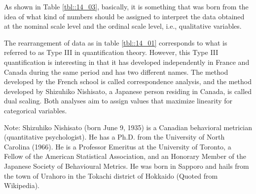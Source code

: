 \documentclass{ltjsbook}
\begin{document}
As shown in Table \ref{tbl::14_03}, basically, it is something that was born from the idea of what kind of numbers should be assigned to interpret the data obtained at the nominal scale level and the ordinal scale level, i.e., qualitative variables.

The rearrangement of data as in table \ref{tbl::14_01} corresponds to what is referred to as Type III in quantification theory. However, this Type III quantification is interesting in that it has developed independently in France and Canada during the same period and has two different names. The method developed by the French school is called correspondence analysis, and the method developed by Shizuhiko Nishisato, a Japanese person residing in Canada, is called dual scaling. Both analyses aim to assign values that maximize linearity for categorical variables.

Note: Shizuhiko Nishisato (born June 9, 1935) is a Canadian behavioral metrician (quantitative psychologist). He has a Ph.D. from the University of North Carolina (1966). He is a Professor Emeritus at the University of Toronto, a Fellow of the American Statistical Association, and an Honorary Member of the Japanese Society of Behavioural Metrics. He was born in Sapporo and hails from the town of Urahoro in the Tokachi district of Hokkaido (Quoted from Wikipedia).
\end{document}
